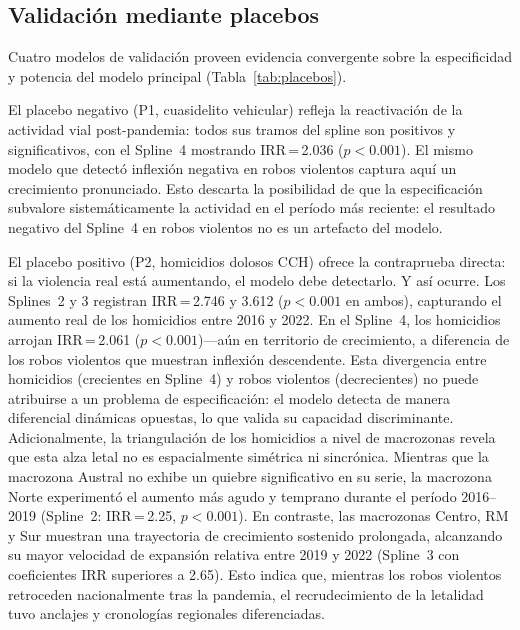 \documentclass[12pt,a4paper]{article}
\begin{document}
\subsection{Validaci\'on mediante placebos}
\label{sub:placebos}

Cuatro modelos de validaci\'on proveen evidencia convergente sobre la especificidad y
potencia del modelo principal (Tabla~\ref{tab:placebos}).

El placebo negativo (P1, cuasidelito vehicular) refleja la reactivaci\'on de la
actividad vial post-pandemia: todos sus tramos del spline son positivos y significativos,
con el Spline~4 mostrando IRR\,=\,2.036 ($p<0.001$). El mismo modelo que detect\'o
inflexi\'on negativa en robos violentos captura aqu\'i un crecimiento pronunciado. Esto
descarta la posibilidad de que la especificaci\'on subvalore sistem\'aticamente la
actividad en el per\'iodo m\'as reciente: el resultado negativo del Spline~4 en robos
violentos no es un artefacto del modelo.

El placebo positivo (P2, homicidios dolosos CCH) ofrece la contraprueba directa: si la
violencia real est\'a aumentando, el modelo debe detectarlo. Y as\'i ocurre. Los
Splines~2 y 3 registran IRR\,=\,2.746 y 3.612 ($p<0.001$ en ambos), capturando el
aumento real de los homicidios entre 2016 y 2022. En el Spline~4, los homicidios
arrojan IRR\,=\,2.061 ($p<0.001$)---a\'un en territorio de crecimiento, a diferencia
de los robos violentos que muestran inflexi\'on descendente. Esta divergencia entre
homicidios (crecientes en Spline~4) y robos violentos (decrecientes) no puede atribuirse
a un problema de especificaci\'on: el modelo detecta de manera diferencial din\'amicas
opuestas, lo que valida su capacidad discriminante. Adicionalmente, la triangulaci\'on de los homicidios a nivel de macrozonas revela que esta alza letal no es espacialmente sim\'etrica ni sincr\'onica. Mientras que la macrozona Austral no exhibe un quiebre significativo en su serie, la macrozona Norte experiment\'o el aumento m\'as agudo y temprano durante el per\'iodo 2016--2019 (Spline~2: IRR\,=\,2.25, $p<0.001$). En contraste, las macrozonas Centro, RM y Sur muestran una trayectoria de crecimiento sostenido prolongada, alcanzando su mayor velocidad de expansi\'on relativa entre 2019 y 2022 (Spline~3 con coeficientes IRR superiores a 2.65). Esto indica que, mientras los robos violentos retroceden nacionalmente tras la pandemia, el recrudecimiento de la letalidad tuvo anclajes y cronolog\'ias regionales diferenciadas.
\end{document}
